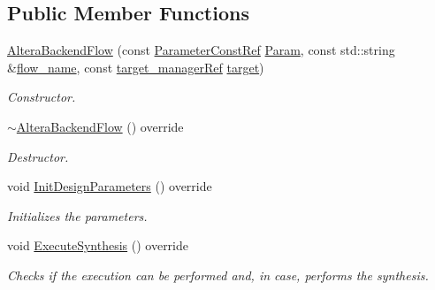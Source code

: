 \subsection*{Public Member Functions}
\begin{DoxyCompactItemize}
\item 
\hyperlink{classAlteraBackendFlow_aeb3203a30034d5650f1dd14133887224}{Altera\+Backend\+Flow} (const \hyperlink{Parameter_8hpp_a37841774a6fcb479b597fdf8955eb4ea}{Parameter\+Const\+Ref} \hyperlink{classBackendFlow_a7d21e7cf0afc64b13e0009c9e351873d}{Param}, const std\+::string \&\hyperlink{classBackendFlow_acb230ccab7e32cf0a88811097ff8c3f8}{flow\+\_\+name}, const \hyperlink{target__manager_8hpp_aee0b586a84fb6eb4faefa6e41e1735a9}{target\+\_\+manager\+Ref} \hyperlink{classBackendFlow_a693ab6eaf29b1836eb91dcd92eb0189f}{target})
\begin{DoxyCompactList}\small\item\em Constructor. \end{DoxyCompactList}\item 
\hyperlink{classAlteraBackendFlow_a5d0a20b521fcadf6e5cd03e9ce876351}{$\sim$\+Altera\+Backend\+Flow} () override
\begin{DoxyCompactList}\small\item\em Destructor. \end{DoxyCompactList}\item 
void \hyperlink{classAlteraBackendFlow_aef7d0e07aaf000ba9d93cdde6761daeb}{Init\+Design\+Parameters} () override
\begin{DoxyCompactList}\small\item\em Initializes the parameters. \end{DoxyCompactList}\item 
void \hyperlink{classAlteraBackendFlow_a02d5cfd65ba8c97fd8b3c9781014c22c}{Execute\+Synthesis} () override
\begin{DoxyCompactList}\small\item\em Checks if the execution can be performed and, in case, performs the synthesis. \end{DoxyCompactList}\end{DoxyCompactItemize}
